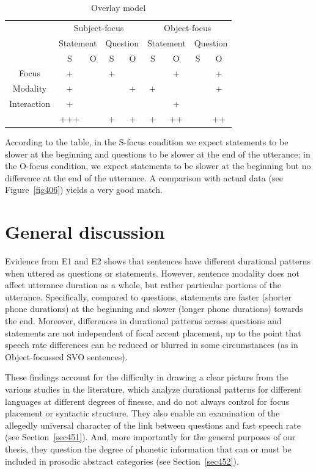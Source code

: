 \begin{table}[h]
\centering
\begin{tabular}{c || c c | c c || c c | c c}
& \multicolumn{4}{c}{Subject-focus} & \multicolumn{4}{c}{Object-focus}\\
& \multicolumn{2}{c}{Statement} & \multicolumn{2}{c}{Question} & \multicolumn{2}{c}{Statement} & \multicolumn{2}{c}{Question}\\
& S & O & S & O & S & O & S & O\\
\hline
Focus & + &   & + &   &   & + &   & + \\
Modality & + &   &   & + & + &   &   & + \\
Interaction & + &   &   &   &   & + &   &  \\
\hline
& +++ & & + & + & + & ++ & & ++ \\
\end{tabular}
\caption{Overlay model}
\label{tab43}\end{table}

According to the table, in the S-focus condition we expect statements to be slower at the beginning and questions to be slower at the end of the utterance; in the O-focus condition, we expect statements to be slower at the beginning but no difference at the end of the utterance. A comparison with actual data (see Figure~\ref{fig406}) yields a very good match.

\section{General discussion}\label{sec45}
Evidence from E1 and E2 shows that sentences have different durational patterns when uttered as questions or statements. However, sentence modality does not affect utterance duration as a whole, but rather particular portions of the utterance. Specifically, compared to questions, statements are faster (shorter phone durations) at the beginning and slower (longer phone durations) towards the end. Moreover, differences in durational patterns across questions and statements are not independent of focal accent placement, up to the point that speech rate differences can be reduced or blurred in some circumstances (as in Object-focussed SVO sentences). 

These findings account for the difficulty in drawing a clear picture from the various studies in the literature, which analyze durational patterns for different languages at different degrees of finesse, and do not always control for focus placement or syntactic structure. They also enable an examination of the allegedly universal character of the link between questions and fast speech rate (see Section~\ref{sec451}). And, more importantly for the general purposes of our thesis, they question the degree of phonetic information that can or must be included in prosodic abstract categories (see Section~\ref{sec452}).


